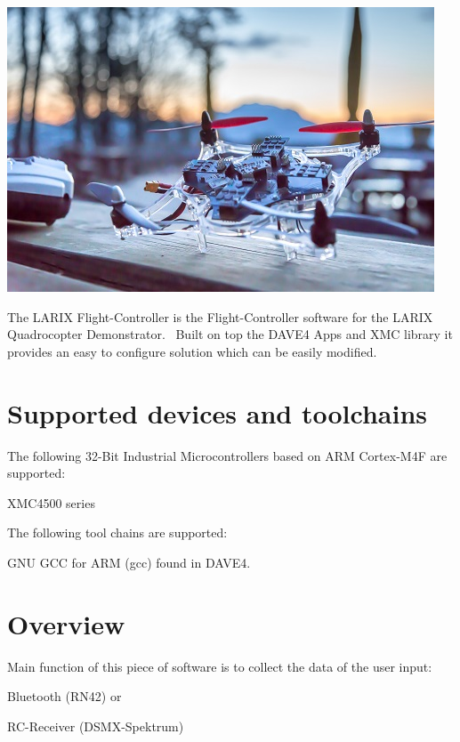  
\begin{DoxyImageNoCaption}
  \mbox{\includegraphics[width=\textwidth,height=\textheight/2,keepaspectratio=true]{QuadroMainpage.jpg}}
\end{DoxyImageNoCaption}


The L\+A\+R\+IX Flight-\/\+Controller is the Flight-\/\+Controller software for the L\+A\+R\+IX Quadrocopter Demonstrator.~\newline
 Built on top the D\+A\+V\+E4 Apps and X\+MC library it provides an easy to configure solution which can be easily modified.~\newline
\hypertarget{index_support}{}\section{Supported devices and toolchains}\label{index_support}
The following 32-\/\+Bit Industrial Microcontrollers based on A\+RM Cortex-\/\+M4F are supported\+:
\begin{DoxyItemize}
\item X\+M\+C4500 series
\end{DoxyItemize}

The following tool chains are supported\+:
\begin{DoxyItemize}
\item G\+NU G\+CC for A\+RM (gcc) found in D\+A\+V\+E4.
\end{DoxyItemize}\hypertarget{index_overview}{}\section{Overview}\label{index_overview}
Main function of this piece of software is to collect the data of the user input\+:
\begin{DoxyItemize}
\item Bluetooth (R\+N42) or
\item R\+C-\/\+Receiver (D\+S\+M\+X-\/\+Spektrum) ~\newline

\end{DoxyItemize}

